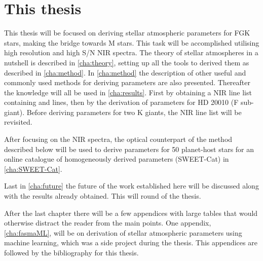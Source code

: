 \section{This thesis}
\label{sec:this_thesis}

This thesis will be focused on deriving stellar atmospheric parameters for FGK stars, making the
bridge towards M stars. This task will be accomplished utilising high resolution and high S/N NIR
spectra. The theory of stellar atmospheres in a nutshell is described in \cref{cha:theory}, setting
up all the tools to derived them as described in \cref{cha:method}. In \cref{cha:method} the
description of other useful and commonly used methods for deriving parameters are also presented.
Thereafter the knowledge will all be used in \cref{cha:results}. First by obtaining a NIR line list
containing  and  lines, then by the derivation of parameters for HD 20010 (F
sub-giant). Before deriving parameters for two K giants, the NIR line list will be revisited.

After focusing on the NIR spectra, the optical counterpart of the method described below will be
used to derive parameters for 50 planet-host stars for an online catalogue of homogeneously derived
parameters (SWEET-Cat) in \cref{cha:SWEET-Cat}.

Last in \cref{cha:future} the future of the work established here will be discussed along with the
results already obtained. This will round of the thesis.

After the last chapter there will be a few appendices with large tables that would otherwise
distract the reader from the main points. One appendix, \cref{cha:fasmaML}, will be on derivation of
stellar atmospheric parameters using machine learning, which was a side project during the thesis.
This appendices are followed by the bibliography for this thesis.
